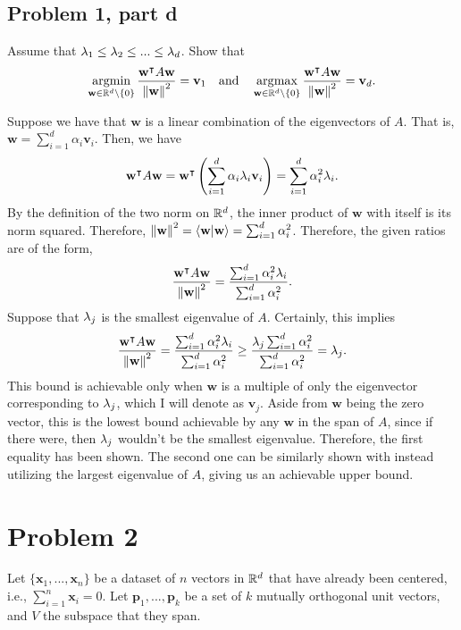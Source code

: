 \newpage
\subsection{Problem 1, part d}
Assume that $\mathrm{\lambda}_1 \leq \mathrm{\lambda}_2 \leq ... \leq \mathrm{\lambda}_d$. Show that 
\[\operatorname*{argmin}_{\textbf{w} \in \mathbb{R}^d \setminus \{0\}} \frac{\textbf{w}^{\intercal} A\textbf{w}}{\norm{\textbf{w}}^2} = \textbf{v}_1 \quad \text{and} \quad \operatorname*{\arg\!\max}_{\textbf{w} \in \mathbb{R}^d \setminus \{0\}}  \frac{\textbf{w}^{\intercal} A\textbf{w}}{\norm{\textbf{w}}^2} = \textbf{v}_d.\]
\partbreak
\begin{solution}

    Suppose we have that $\textbf{w}$ is a linear combination of the eigenvectors of $A$. That is, $\textbf{w} = \sum_{i =1}^d \alpha_i \textbf{v}_i$. Then, we have
    \[\textbf{w}^{\intercal} A\textbf{w} = \textbf{w}^{\intercal} \left (\sum_{i = 1}^d \alpha_i \mathrm{\lambda}_i \textbf{v}_i\right) = \sum_{i  =1}^d \alpha_i^2 \mathrm{\lambda}_i.\]
    By the definition of the two norm on $\mathbb{R}^d$, the inner product of $\textbf{w}$ with itself is its norm squared. Therefore, $\norm{\textbf{w}}^2 = \braket{\textbf{w}}{\textbf{w}} = \sum_{i = 1}^d \alpha_i^2$. Therefore, the given ratios are of the form, 
    \[\frac{\textbf{w}^{\intercal} A\textbf{w}}{\norm{\textbf{w}}^2} = \frac{\sum_{i = 1}^d \alpha_i^2 \mathrm{\lambda}_i}{\sum_{i = 1}^d \alpha_i^2}.\]
    Suppose that $\mathrm{\lambda}_j$ is the smallest eigenvalue of $A$. Certainly, this implies 
    \[\frac{\textbf{w}^{\intercal} A\textbf{w}}{\norm{\textbf{w}}^2} = \frac{\sum_{i = 1}^d \alpha_i^2 \mathrm{\lambda}_i}{\sum_{i = 1}^d \alpha_i^2} \geq \frac{\mathrm{\lambda}_j\sum_{i = 1}^d \alpha_i^2 }{\sum_{i = 1}^d \alpha_i^2} = \mathrm{\lambda}_j.\]
    This bound is achievable only when $\textbf{w}$ is a multiple of only the eigenvector corresponding to $\mathrm{\lambda}_j$, which I will denote as $\textbf{v}_j$. Aside from $\textbf{w}$ being the zero vector, this is the lowest bound achievable by any $\textbf{w}$ in the span of $A$, since if there were, then $\mathrm{\lambda}_j$ wouldn't be the smallest eigenvalue. Therefore, the first equality has been shown. The second one can be similarly shown with instead utilizing the largest eigenvalue of $A$, giving us an achievable upper bound. 


\end{solution}

\newpage
\section{Problem 2}
Let $\{\textbf{x}_1, ..., \textbf{x}_n\}$ be a dataset of $n$ vectors in $\mathbb{R}^d$ that have already been centered, i.e., $\sum_{i = 1}^n \textbf{x}_i = 0$. Let $\textbf{p}_1, ..., \textbf{p}_k$ be a set of $k$ mutually orthogonal unit vectors, and $V$ the subspace that they span. 
